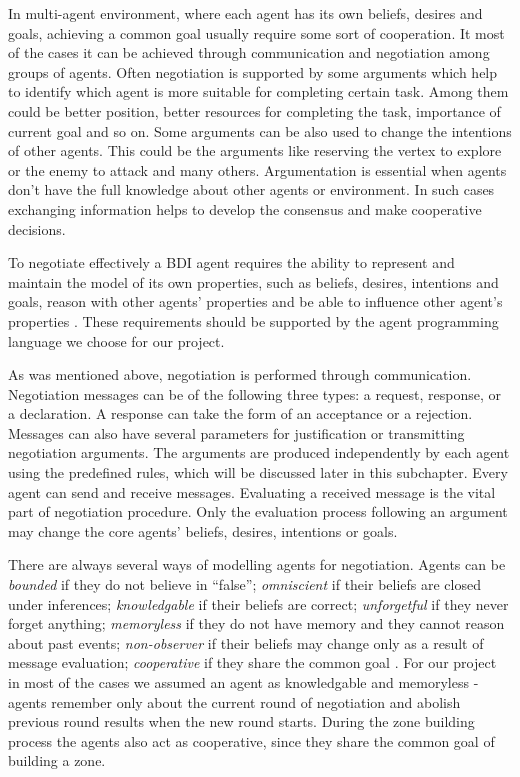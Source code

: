 In multi-agent environment, where each agent has its own beliefs, desires and goals, achieving a common goal usually require some sort of cooperation.
It most of the cases it can be achieved through communication and negotiation among groups of agents.
Often negotiation is supported by some arguments which help to identify which agent is more suitable for completing certain task.
Among them could be better position, better resources for completing the task, importance of current goal and so on.
Some arguments can be also used to change the intentions of other agents.
This could be the arguments like reserving the vertex to explore or the enemy to attack and many others.
Argumentation is essential when agents don't have the full knowledge about other agents or environment.
In such cases exchanging information helps to develop the consensus and make cooperative decisions.

To negotiate effectively a BDI agent requires the ability to represent and maintain the model of its own properties, such as beliefs, desires, intentions and goals, reason with other agents' properties and be able to influence other agent's properties \cite{Kraus_98}.
These requirements should be supported by the agent programming language we choose for our project.

As was mentioned above, negotiation is performed through communication.
Negotiation messages can be of the following three types: a request, response, or a declaration.
A response can take the form of an acceptance or a rejection.
Messages can also have several parameters for justification or transmitting negotiation arguments.
The arguments are produced independently by each agent using the predefined rules, which will be discussed later in this subchapter.
Every agent can send and receive messages.
Evaluating a received message is the vital part of negotiation procedure.
Only the evaluation process following an argument may change the core agents' beliefs, desires, intentions or goals.

There are always several ways of modelling agents for negotiation.
Agents can be \emph{bounded} if they do not believe in ``false''; \emph{omniscient} if their beliefs are closed under inferences; \emph{knowledgable} if  their beliefs are correct; \emph{unforgetful} if they never forget anything; \emph{memoryless} if they do not have memory and they cannot reason about past events; \emph{non-observer} if their beliefs may change only as a result of message evaluation; \emph{cooperative} if they share the common goal \cite{Kraus_98}.
For our project in most of the cases we assumed an agent as knowledgable and memoryless - agents remember only about the current round of negotiation and abolish previous round results when the new round starts.
During the zone building process the agents also act as cooperative, since they share the common goal of building a zone.

